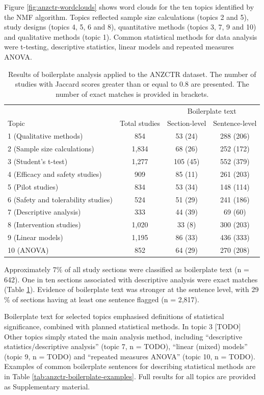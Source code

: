 \documentclass[12pt]{article}
\begin{document}
Figure \ref{fig:anzctr-wordclouds} shows word clouds for the ten topics identified by the NMF algorithm. Topics reflected sample size calculations (topics 2 and 5), 
study designs (topics 4, 5, 6 and 8),
quantitative methods (topics 3, 7, 9 and 10) and qualitative methods (topic 1). 
Common statistical methods for data analysis were t-testing, descriptive statistics, linear models and repeated measures ANOVA.

\begin{table}[htbp]
\centering
\caption{Results of boilerplate analysis applied to the ANZCTR dataset. The number of studies with Jaccard scores greater than or equal to 0.8 are presented. The number of exact matches is provided in brackets.}
\label{tab:anzctr-boilerplate-matches}
\begin{tabular}{lccc}
\hline
 &  & \multicolumn{2}{c}{Boilerplate text} \\
\cline{3-4}
Topic & Total studies & Section-level & {Sentence-level}\\
\hline
1 (Qualitative methods)& 854 & 53 (24) & 288 (206)\\
2 (Sample size calculations) & 1,834 & 68 (26) & 252 (172)\\
3 (Student's t-test) & 1,277 & 105 (45) & 552 (379)\\
4 (Efficacy and safety studies) & 909 & 85 (11) & 261 (203)\\
5 (Pilot studies) & 834 &  53 (34) & 148 (114)\\
6 (Safety and tolerability studies) & 524 & 51 (29) & 241 (186)\\
7 (Descriptive analysis) & 333 & 44 (39) & 69 (60)\\
8 (Intervention studies) & 1,020 & 33 (8) & 300 (203)\\
9 (Linear models) & 1,195 & 86 (33) & 436 (333)\\
10 (ANOVA) & 852 &  64 (29) & 270 (208)\\
\hline
\end{tabular}
\end{table}

Approximately 7$\%$ of all study sections were classified as boilerplate text (n = 642). One in ten sections associated with descriptive analysis were exact matches (Table \ref{tab:anzctr-boilerplate-matches}). Evidence of boilerplate text was stronger at the sentence level, with 29$\%$ of sections having at least one sentence flagged (n = 2,817).

Boilerplate text for selected topics emphasised definitions of statistical significance, combined with planned statistical methods. In topic 3 [TODO] Other topics simply stated the main analysis method, including ``descriptive statistics/descriptive analysis'' (topic 7, n = TODO), ``linear (mixed) models'' (topic 9, n = TODO) and ``repeated measures ANOVA'' (topic 10, n = TODO). Examples of common boilerplate sentences for describing statistical methods are in Table \ref{tab:anzctr-boilerplate-examples}. Full results for all topics are provided as Supplementary material.
\end{document}
